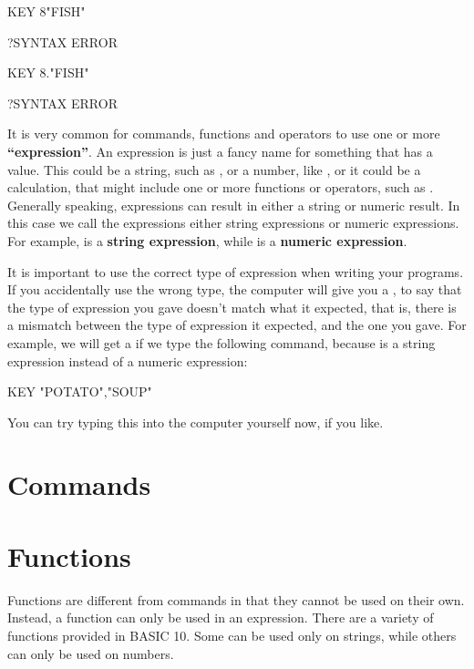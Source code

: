 \begin{screenoutput}
  KEY 8"FISH"

  ?SYNTAX ERROR

  KEY 8."FISH"

  ?SYNTAX ERROR
\end{screenoutput}

It is very common for commands, functions and operators to use one or more {\bf``expression''}.
An expression is just a fancy name for something that has a value.
This could be a string, such as , or a number, like , or it could be a calculation, that might include
one or more functions or operators, such as .
Generally speaking, expressions can result in either a string or numeric result.
In this case we call the expressions either string expressions or numeric expressions.
For example,  is a {\bf string expression}, while  is a {\bf numeric expression}.

It is important to use the correct type of expression when writing your programs.
If you accidentally use the wrong type, the computer will give you a , to say that the type
of expression you gave doesn't match what it expected, that is, there is a mismatch between the type of expression
it expected, and the one you gave.  For example, we will get a  if we type the following command,
because  is a string expression instead of a numeric expression:

\begin{screenoutput}
  KEY "POTATO","SOUP"
\end{screenoutput}

You can try typing this into the computer yourself now, if you like.


\section{Commands}

\section{Functions}

Functions are different from commands in that they cannot be used on their own.
Instead, a function can only be used in an expression.
There are a variety of functions provided in BASIC 10.
Some can be used only on strings, while others can only be used on numbers.

